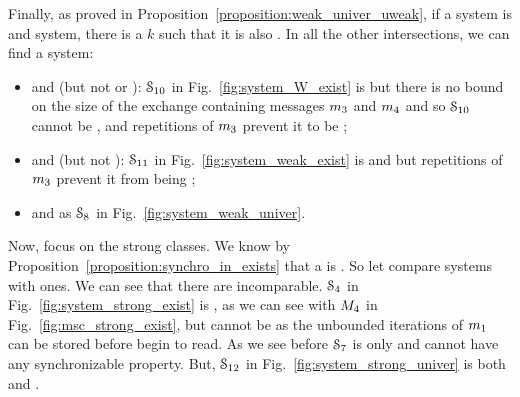 Finally, as proved in Proposition~\ref{proposition:weak_univer_uweak}, if a system is \wS{} and \ub{} system, there is a $k$ such that it is also . In all the other intersections, we can find a system:
\begin{itemize}
  \item \wS{} and \eb{} (but not  or \ub{}): $\mathcal{S}_{10}$ in Fig.~\ref{fig:system_W_exist} is  but there is no bound on the size of the exchange containing messages $m_3$ and $m_4$ and so $\mathcal{S}_{10}$ cannot be , and repetitions of $m_3$ prevent it to be \ub{};
\end{itemize}
  \begin{center}
    \begin{minipage}[c]{6cm}
      
  \end{minipage}
  \hspace*{1cm}
  \begin{minipage}[c]{3.5cm}
    
  \end{minipage}
  \end{center}
  \begin{itemize}
      \item {} and \eb{} (but not \ub{}): $\mathcal{S}_{11}$ in Fig.~\ref{fig:system_weak_exist} is  and  but repetitions of $m_3$ prevent it from being \ub{};
  \end{itemize}
  \begin{center}
    \begin{minipage}[c]{6cm}
      
  \end{minipage}
  \hspace*{1cm}
  \begin{minipage}[c]{3.5cm}
    
  \end{minipage}
  \end{center}
\begin{itemize}
  \item {} and \ub{} as $\mathcal{S}_{8}$ in Fig.~\ref{fig:system_weak_univer}.

\end{itemize}







Now, focus on the strong classes. We know by
Proposition~\ref{proposition:synchro_in_exists} that a  is \eb{}. So let
compare  systems with \ub{} ones.  We can see that there are incomparable.
$\mathcal{S}_{4}$ in Fig.~\ref{fig:system_strong_exist} is , as we can
see with $M_{4}$ in Fig.~\ref{fig:msc_strong_exist}, but cannot be \ub{} as
the unbounded iterations of $m_1$ can be stored before begin to read.
As we see before $\mathcal{S}_7$ is only \ub{} and cannot have any synchronizable property. But, $\mathcal{S}_{12}$ in Fig.~\ref{fig:system_strong_univer} is both  and .

